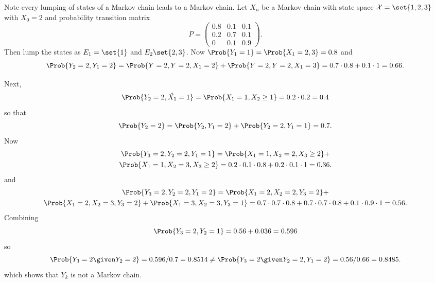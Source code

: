 \documentclass[12pt]{article}
\begin{document}
  \begin{example}
    Note every lumping of states of a Markov chain leads to a Markov
    chain. Let $X_n$ be a Markov chain with state space $\mathcal{X} =
    \set{1,2, 3}$ with $X_0 = 2$ and probability transition matrix
    \[
      P =   \begin{pmatrix}
    0.8 & 0.1 & 0.1 \\
    0.2 & 0.7 & 0.1 \\
    0   & 0.1 & 0.9
  \end{pmatrix}.
    \]
    Then lump the states as $E_1 = \set{1}$ and $E_2 \set{2,3}$.  Now
    \( \Prob{Y_1 = 1} = \Prob{X_1 = 2,3} = 0.8 \) and
    \[
    \Prob{Y_2 = 2, Y_1 = 2} = \Prob{Y = 2, Y
      =2, X_1 = 2} + \Prob{Y = 2, Y=2, X_1 = 3} 
    = 0.7 \cdot 0.8 + 0.1 \cdot 1 = 0.66.
    \]

    Next,
    \[
      \Prob{Y_2 = 2, \hat{X_1} = 1} = \Prob{X_1 = 1, X_2 \ge 1}
      = 0.2 \cdot 0.2 = 0.4
    \]
    so that
    \[
      \Prob{Y_2 = 2} = \Prob{Y_2, Y_1 = 2} + \Prob{Y_2=2, Y_1 = 1} = 0.7.
    \]
    Now
    \begin{multline*}
      \Prob{Y_3 = 2, Y_2=2, Y_1=1} = \Prob{X_1=1, X_2=2, X_3 \ge 2} +\\
       \Prob{X_1=1, X_2=3, X_3 \ge 2} = 0.2 \cdot 0.1 \cdot 0.8 + 0.2
       \cdot 0.1 \cdot 1 = 0.36.
     \end{multline*}
     and
    \begin{multline*}
      \Prob{Y_3 = 2, Y_2=2, Y_1=2} = \Prob{X_1=2, X_2=2, Y_3 =2} +\\
       \Prob{X_1=2, X_2=3, Y_3 =2} + \Prob{X_1=3, X_2=3, Y_3 =1} = 0.7 \cdot 0.7 \cdot 0.8 + 0.7
       \cdot 0.7 \cdot 0.8 + 0.1 \cdot 0.9 \cdot 1 = 0.56.
     \end{multline*}
     Combining
     \[
       \Prob{Y_3 = 2, Y_2 = 1} = 0.56 + 0.036 = 0.596
     \]
     so
     \[
       \Prob{Y_3=2 \given Y_2 = 2} = 0.596/0.7 = 0.8514 \ne \Prob{Y_3
         = 2 \given Y_2 = 2, Y_1=2} = 0.56/0.66 = 0.8485.
     \]
     which shows that $Y_k$ is not a Markov chain.
  \end{example}
\end{document}
